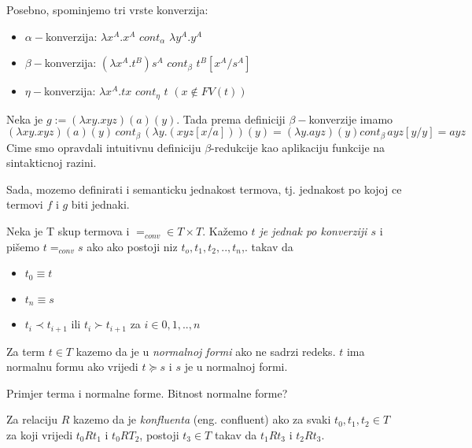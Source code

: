 Posebno, spominjemo tri vrste konverzija:
\begin{itemize}
  \item $\alpha-$konverzija: $\lambda x^A . x^A $ $cont_\alpha$ $\lambda y^A . y^A$
  \item $\beta-$konverzija: $(\lambda x^A . t^B) s^A$ $cont_\beta$ $t^B[x^A/s^A]$
  \item $\eta-$konverzija: $\lambda x^A . t x $ $cont_\eta$ $t$ $(x \not\in FV(t))$
\end{itemize} 

\begin{primjer}
  Neka je $g := (\lambda x y . x y z) (a) (y)$. Tada prema definiciji $\beta-$konverzije imamo
  \begin{equation*}
    (\lambda x y . x y z) (a) (y)\, cont_\beta \,(\lambda y. (x y z [x/a])) (y)  = (\lambda y.a y z) (y) cont_\beta \, a y z [y / y]  = a y z
  \end{equation*}
  Cime smo opravdali intuitivnu definiciju $\beta$-redukcije kao aplikaciju funkcije na sintakticnoj razini.
\end{primjer}

Sada, mozemo definirati i semanticku jednakost termova, tj. jednakost po kojoj ce termovi $f$ i $g$ biti jednaki.

\begin{definition}
  Neka je T skup termova i $=_{conv} \in T \times T$. Kažemo \emph{$t$ je jednak po konverziji $s$} i pišemo $t =_{conv} s$ ako ako postoji niz $t_o, t_1, t_2, .., t_n$,. takav da
  \begin{itemize}
    \item $t_0 \equiv t$
    \item $t_n \equiv s$
    \item $t_i \prec t_{i+1}$ ili $t_i \succ t_{i+1}$ za $i \in {0, 1, .., n}$
  \end{itemize}
\end{definition}

\begin{definition}
  Za term $t \in T$ kazemo da je u \emph{normalnoj formi} ako ne sadrzi redeks. $t$ ima normalnu formu ako vrijedi $t \succeq s$ i $s$ je u normalnoj formi.
\end{definition}

\begin{primjer}
  Primjer terma i normalne forme. Bitnost normalne forme?
\end{primjer}

\begin{definition}
  Za relaciju $R$ kazemo da je \emph{konfluenta} (eng. confluent) ako za svaki $t_0, t_1, t_2 \in T$ za koji vrijedi $t_0 R t_1$ i $t_0 R T_2$, postoji $t_3 \in T$ takav da $t_1 R t_3$ i $t_2 R t_3$.
\end{definition}


